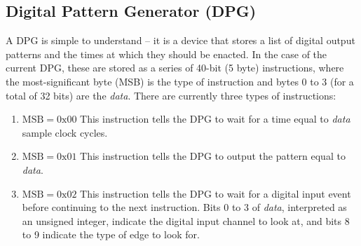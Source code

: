 \documentclass[]{article}
\begin{document}
\subsection{Digital Pattern Generator (DPG)}
\label{ssec:dpg}
A DPG is simple to understand -- it is a device that stores a list of digital output patterns and the times at which they should be enacted.  In the case of the current DPG, these are stored as a series of 40-bit (5 byte) instructions, where the most-significant byte (MSB) is the type of instruction and bytes 0 to 3 (for a total of 32 bits) are the \emph{data}.  There are currently three types of instructions:
\begin{enumerate}
	\item $\mathrm{MSB} = 0\mathrm{x}00$ This instruction tells the DPG to wait for a time equal to \emph{data} sample clock cycles.
	\item $\mathrm{MSB} = 0\mathrm{x}01$ This instruction tells the DPG to output the pattern equal to \emph{data}.
	\item $\mathrm{MSB} = 0\mathrm{x}02$ This instruction tells the DPG to wait for a digital input event before continuing to the next instruction.  Bits 0 to 3 of \emph{data}, interpreted as an unsigned integer, indicate the digital input channel to look at, and bits 8 to 9 indicate the type of edge to look for.
\end{enumerate}
\end{document}
